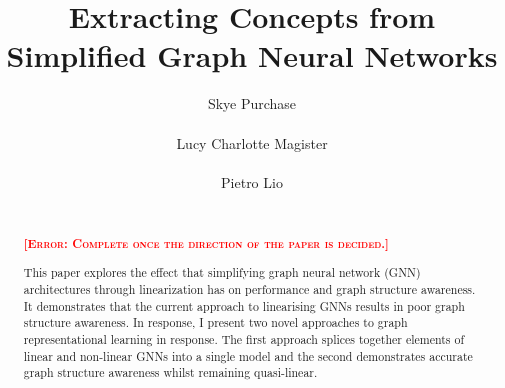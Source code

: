 \documentclass{article}
\title[Extracting Concepts from Simplified Graph Neural Networks]{Extracting Concepts from Simplified Graph Neural Networks}
\author[S. Purchase et al.]{%
Skye Purchase\\
\institute{University of Cambridge}\\
\email{skyepurchase@gmail.com}\And
Lucy Charlotte Magister\\
\institute{University of Cambridge}\\
\email{Fillin}\And
Pietro Lio\\
\institute{University of Cambridge}\\
\email{Fillin}
}
\newcommand\error[1]{\textcolor{red}{\textsc{\textbf{[Error: #1]}}}}
\begin{document}


\maketitle

\begin{abstract}
    \error{Complete once the direction of the paper is decided.}

    This paper explores the effect that simplifying graph neural network (GNN) architectures through linearization has on performance and graph structure awareness.
    It demonstrates that the current approach to linearising GNNs results in poor graph structure awareness. In response, I present two novel approaches to graph representational learning in response.
    The first approach splices together elements of linear and non-linear GNNs into a single model and the second demonstrates accurate graph structure awareness whilst remaining quasi-linear.

\end{abstract}




\end{document}
